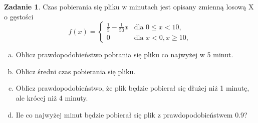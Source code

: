 \documentclass[11pt]{article}
\theoremstyle{definition}
\newtheorem{zadanie}{Zadanie}
\numberwithin{zadanie}{section}
\begin{document}
\begin{zadanie}
    Czas pobierania się pliku w minutach jest opisany zmienną losową X o gęstości
    \[
        f(x) =
        \left\{\begin{array}{lr}
            \frac15-\frac1{50}x & \text{dla } 0\leq x < 10,  \\
            0                   & \text{dla } x<0, x\geq 10,
        \end{array}\right.
    \]

    \begin{enumerate}[a)]
        \item Oblicz prawdopodobieństwo pobrania się pliku co najwyżej w 5 minut.
        \item Oblicz średni czas pobierania się pliku.
        \item Oblicz prawdopodobieństwo, że plik będzie pobierał się dłużej niż 1 minutę, ale krócej niż 4 minuty.
        \item Ile co najwyżej minut będzie pobierał się plik z prawdopodobieństwem 0.9?
    \end{enumerate}
\end{zadanie}
\end{document}
